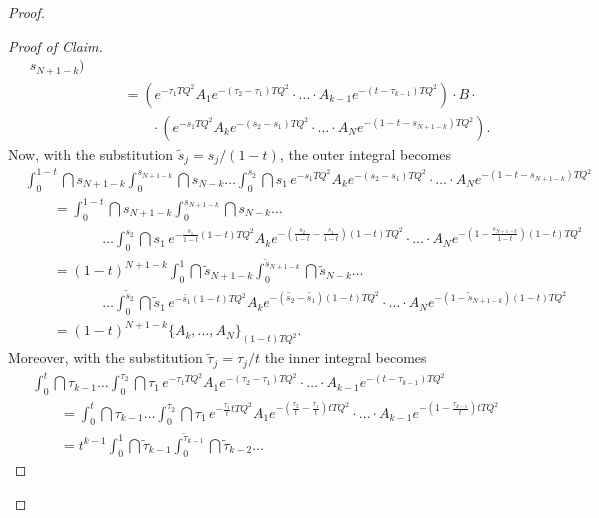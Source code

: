 \documentclass[a4paper, english, 12pt, bibliography=totocnumbered,
index=totoc]{scrartcl}
\begin{document}
\begin{proof}
\begin{proof}[Proof of Claim]
\begin{align*}
			s_{N+1 - k}) \\
			& \qquad = \left(e^{-\tau_1 TQ^2}A_1
			e^{-(\tau_2 - \tau_1)TQ^2} \cdot \ldots \cdot A_{k-1} e^{-(t -
				\tau_{k-1})TQ^2}\right) \cdot B \cdot \\
			& \qquad \qquad \cdot \left(e^{-s_1 TQ^2} A_k e^{-(s_2 - s_1)TQ^2}
			\cdot \ldots \cdot A_N e^{-(1 - t - s_{N+1 - k})TQ^2}\right).
		\end{align*}
		Now, with the substitution $\tilde{s}_j = s_j/(1-t)$, the outer
		integral becomes
		\footnotesize
		\begin{align*}
			& \int_{0}^{1-t} \dint s_{N+1 - k}
			\int_{0}^{s_{N+1 -k}} \dint s_{N-k} \ldots
			\int_{0}^{s_2} \dint s_1 \, e^{-s_1 TQ^2} A_k e^{-(s_2 - s_1)TQ^2}
			\cdot \ldots \cdot A_N e^{-(1 - t - s_{N+1 - k})TQ^2} \\
			& \qquad = \int_{0}^{1-t} \dint s_{N+1 - k}
			\int_{0}^{s_{N+1 -k}} \dint s_{N-k} \ldots \\
			& ~~~~~~~~~~~~~~~~~~~~~~~~~ \ldots
			\int_{0}^{s_2} \dint s_1 \, e^{-\frac{s_1}{1-t}(1-t)TQ^2} A_k
			e^{-(\frac{s_2}{1-t} - \frac{s_1}{1-t})(1-t)TQ^2}
			\cdot \ldots \cdot A_N e^{-(1 - \frac{s_{N+1 -
						k}}{1-t})(1-t)TQ^2} \\
			& \qquad = (1-t)^{N+1-k} \int_0^1 \dint \tilde{s}_{N+1-k}
			\int_0^{\tilde{s}_{N+1-k}} \dint \tilde{s}_{N-k} \ldots \\
			& ~~~~~~~~~~~~~~~~~~~~~~~~~ \ldots
			\int_0^{\tilde{s}_2} \dint \tilde{s}_1 \,
			e^{-\tilde{s_1}(1-t)TQ^2}A_k e^{-(\tilde{s_2} -
				\tilde{s_1})(1-t)TQ^2} \cdot \ldots \cdot A_N e^{-(1 -
				\tilde{s}_{N+1-k})(1-t)TQ^2} \\
			& \qquad = (1-t)^{N+1 - k} \{A_k, \ldots, A_N\}_{(1-t)TQ^2}.
		\end{align*}
		\normalsize
		Moreover, with the substitution $\tilde{\tau}_j = \tau_j/t$ the inner
		integral becomes
		\footnotesize
		\begin{align*}
			& \int_0^{t} \dint \tau_{k-1}
			\ldots \int_0^{\tau_2}
			\dint \tau_1 \, e^{-\tau_1 TQ^2}A_1
			e^{-(\tau_2 - \tau_1)TQ^2} \cdot \ldots \cdot A_{k-1} e^{-(t -
				\tau_{k-1})TQ^2} \\
			& \qquad = \int_0^{t} \dint \tau_{k-1}
			\ldots \int_0^{\tau_2}
			\dint \tau_1 \, e^{-\frac{\tau_1}{t} tTQ^2}A_1
			e^{-(\frac{\tau_2}{t} - \frac{\tau_1}{t})tTQ^2} \cdot \ldots
			\cdot A_{k-1} e^{-(1 - \frac{\tau_{k-1}}{t})tTQ^2} \\
			& \qquad = t^{k-1} \int_0^1 \dint \tilde{\tau}_{k-1}
			\int_0^{\tilde{\tau}_{k-1}} \dint \tilde{\tau}_{k-2} \ldots

\end{align*}
\end{proof}
\end{proof}
\end{document}

